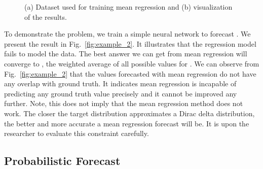 \documentclass{ieeeaccess}
\begin{document}
\begin{figure*}[t]
	\centering
	\hfill
	\caption{(a) Dataset used for training mean regression and (b) visualization of the results.}
	\label{fig:example} 
\end{figure*}
To demonstrate the problem, we train a simple neural network to forecast . We present the result in Fig.~\ref{fig:example_2}. It illustrates that the regression model fails to model the data. The best answer we can get from mean regression will converge to , the weighted average of all possible values for . We can observe from Fig.~\ref{fig:example_2} that the values forecasted with mean regression do not have any overlap with ground truth. It indicates mean regression is incapable of predicting any ground truth value precisely and it cannot be improved any further. Note, this does not imply that the mean regression method does not work. The closer the target distribution approximates a Dirac delta distribution, the better and more accurate a mean regression forecast will be. It is upon the researcher to evaluate this constraint carefully.

\subsection{Probabilistic Forecast}
\end{document}
